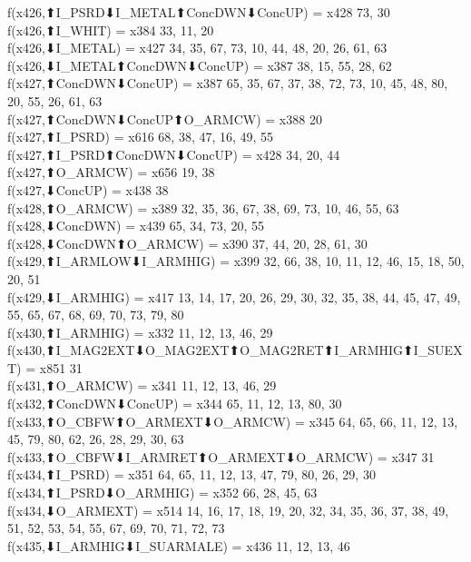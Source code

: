 f(x426,⬆I_PSRD⬇I_METAL⬆ConcDWN⬇ConcUP) = x428 {73, 30} \\
f(x426,⬆I_WHIT) = x384 {33, 11, 20} \\
f(x426,⬇I_METAL) = x427 {34, 35, 67, 73, 10, 44, 48, 20, 26, 61, 63} \\
f(x426,⬇I_METAL⬆ConcDWN⬇ConcUP) = x387 {38, 15, 55, 28, 62} \\
f(x427,⬆ConcDWN⬇ConcUP) = x387 {65, 35, 67, 37, 38, 72, 73, 10, 45, 48, 80, 20, 55, 26, 61, 63} \\
f(x427,⬆ConcDWN⬇ConcUP⬆O_ARMCW) = x388 {20} \\
f(x427,⬆I_PSRD) = x616 {68, 38, 47, 16, 49, 55} \\
f(x427,⬆I_PSRD⬆ConcDWN⬇ConcUP) = x428 {34, 20, 44} \\
f(x427,⬆O_ARMCW) = x656 {19, 38} \\
f(x427,⬇ConcUP) = x438 {38} \\
f(x428,⬆O_ARMCW) = x389 {32, 35, 36, 67, 38, 69, 73, 10, 46, 55, 63} \\
f(x428,⬇ConcDWN) = x439 {65, 34, 73, 20, 55} \\
f(x428,⬇ConcDWN⬆O_ARMCW) = x390 {37, 44, 20, 28, 61, 30} \\
f(x429,⬆I_ARMLOW⬇I_ARMHIG) = x399 {32, 66, 38, 10, 11, 12, 46, 15, 18, 50, 20, 51} \\
f(x429,⬇I_ARMHIG) = x417 {13, 14, 17, 20, 26, 29, 30, 32, 35, 38, 44, 45, 47, 49, 55, 65, 67, 68, 69, 70, 73, 79, 80} \\
f(x430,⬆I_ARMHIG) = x332 {11, 12, 13, 46, 29} \\
f(x430,⬆I_MAG2EXT⬇O_MAG2EXT⬆O_MAG2RET⬆I_ARMHIG⬆I_SUEXT) = x851 {31} \\
f(x431,⬆O_ARMCW) = x341 {11, 12, 13, 46, 29} \\
f(x432,⬆ConcDWN⬇ConcUP) = x344 {65, 11, 12, 13, 80, 30} \\
f(x433,⬆O_CBFW⬆O_ARMEXT⬇O_ARMCW) = x345 {64, 65, 66, 11, 12, 13, 45, 79, 80, 62, 26, 28, 29, 30, 63} \\
f(x433,⬆O_CBFW⬇I_ARMRET⬆O_ARMEXT⬇O_ARMCW) = x347 {31} \\
f(x434,⬆I_PSRD) = x351 {64, 65, 11, 12, 13, 47, 79, 80, 26, 29, 30} \\
f(x434,⬆I_PSRD⬇O_ARMHIG) = x352 {66, 28, 45, 63} \\
f(x434,⬇O_ARMEXT) = x514 {14, 16, 17, 18, 19, 20, 32, 34, 35, 36, 37, 38, 49, 51, 52, 53, 54, 55, 67, 69, 70, 71, 72, 73} \\
f(x435,⬇I_ARMHIG⬇I_SUARMALE) = x436 {11, 12, 13, 46} \\
